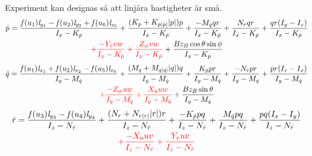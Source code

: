 \documentclass[11pt,aspectratio=169]{beamer}
\begin{document}
\begin{frame}[shrink]
Experiment kan designas så att linjära hastigheter är små.
\begin{multline*}
\dot{p} = \frac{\mathit{f}(u_{1}) \mathit{l}_{y_{1}} - \mathit{f}(u_{2}) \mathit{l}_{y_{2}} + \mathit{f}(u_{6}) \mathit{l}_{z_{6}}}{I_{x} - K_{\dot{p}}} + \frac{ (K_{p} + K_{p|p|} |p|)p}{I_{x} - K_{\dot{p}}}  + \frac{-M_{\dot{q}} q r}{I_{x} - K_{\dot{p}}} +  \frac{N_{\dot{r}} q r}{I_{x} - K_{\dot{p}}}  + \frac{q r (I_{y} - I_{z})}{I_{x} - K_{\dot{p}}} \\{\color{red} + \frac{- Y_{\dot{v}} v w}{I_{x} - K_{\dot{p}}} + \frac{Z_{\dot{w}} v w}{I_{x} - K_{\dot{p}}}} + \frac{B z_B \cos{\theta} \sin{\phi}}{I_{x} - K_{\dot{p}}}
\end{multline*}
\begin{multline*}
\dot{q} =\frac{\mathit{f}(u_{1}) \mathit{l}_{x_{1}} + \mathit{f}(u_{2}) \mathit{l}_{x_{2}} - \mathit{f}(u_{5}) \mathit{l}_{x_{5}}}{I_{y} - M_{\dot{q}}} + \frac{(M_{q} + M_{q|q|} |q|)q}{I_{y} - M_{\dot{q}}} + \frac{K_{\dot{p}} p r}{I_{y} - M_{\dot{q}}} + \frac{-N_{\dot{r}} p r}{I_{y} - M_{\dot{q}}}  +
\frac{p r (I_{z} - I_{x})}{I_{y} - M_{\dot{q}}} \\ {\color{red} + \frac{-Z_{\dot{w}} u w}{I_{y} - M_{\dot{q}}} + \frac{X_{\dot{u}} u w}{I_{y} - M_{\dot{q}}}} + \frac{B z_B \sin{\theta} }{I_{y} - M_{\dot{q}}} 
\end{multline*}
\begin{multline*}
\dot{r} = \frac{\mathit{f}(u_{3}) \mathit{l}_{y_{3}} - \mathit{f}(u_{4}) \mathit{l}_{y_{4}}}{I_{z} - N_{\dot{r}}} + \frac{(N_{r} + N_{r|r|} |r|)r}{I_{z} - N_{\dot{r}}} + \frac{-K_{\dot{p}} p q}{I_{z} - N_{\dot{r}}} + \frac{M_{\dot{q}} p q}{I_{z} - N_{\dot{r}}} + \frac{p q (I_{x} - I_{y})}{I_{z} - N_{\dot{r}}}\\ {\color{red} + \frac{- X_{\dot{u}} u v}{I_{z} - N_{\dot{r}}} + \frac{Y_{\dot{v}} u v}{I_{z} - N_{\dot{r}}}}
\end{multline*}
\end{frame}
\end{document}
